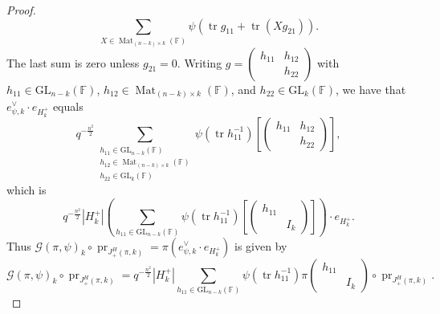 \documentclass[12pt, reqno]{amsart}
\theoremstyle{definition}
\newcommand{\sizeof}[1]{\left|#1\right|}
\newcommand{\fieldCharacter}{\psi}
\newcommand{\IdentityMatrix}[1]{I_{#1}}
\newcommand{\trace}{\operatorname{tr}}
\newcommand{\GL}{\mathrm{GL}}
\newcommand{\Mat}[2]{\operatorname{Mat}_{#1 \times #2}}
\newcommand{\finiteField}{\mathbb{F}}
\newcommand{\GaussSum}[2]{\mathcal{G}\left(#1, #2\right)}
\newcommand{\pHJacquetModule}[2]{J^H_{+}\left(#1, #2\right)}
\newcommand{\ProjectionOperator}{\operatorname{pr}}
\begin{document}
\begin{proof}
		\begin{displaymath}
		\sum_{X \in \Mat{\left(n-k\right)}{k}\left(\finiteField\right)} \fieldCharacter\left(\trace g_{11} + \trace\left(Xg_{21}\right)\right).
		\end{displaymath}
		The last sum is zero unless $g_{21} = 0$. Writing $g = \left(\begin{smallmatrix}
			h_{11} & h_{12}\\
			 & h_{22}
		\end{smallmatrix}\right)$ with $h_{11} \in \GL_{n-k}\left(\finiteField\right)$, $h_{12} \in \Mat{\left(n-k\right)}{k}\left(\finiteField\right)$, and $h_{22} \in \GL_k\left(\finiteField\right)$, we have that $e_{\fieldCharacter, k}^{\vee} \cdot e_{H^+_k}$ equals
		\begin{displaymath}
		q^{-\frac{n^2}{2}} \sum_{\substack{h_{11} \in \GL_{n-k}\left(\finiteField\right)\\
				h_{12} \in \Mat{\left(n-k\right)}{k}\left(\finiteField\right)\\
				h_{22} \in \GL_{k}\left(\finiteField\right) }} \fieldCharacter\left(\trace h_{11}^{-1}\right) \left[\begin{pmatrix}
			h_{11} & h_{12}\\
			& h_{22}
		\end{pmatrix}\right],
		\end{displaymath}
		which is
		\begin{displaymath}
		q^{-\frac{n^2}{2}} \sizeof{H^+_k} \left(\sum_{h_{11} \in \GL_{n-k}\left(\finiteField\right)} \fieldCharacter\left(\trace h_{11}^{-1}\right) \left[\begin{pmatrix}
			h_{11}\\
			& \IdentityMatrix{k}
		\end{pmatrix}\right]\right) \cdot e_{H_k^+}.
		\end{displaymath}
		Thus $\GaussSum{\pi}{\fieldCharacter}_k \circ \ProjectionOperator_{\pHJacquetModule{\pi}{k}} = \pi\left(e_{\fieldCharacter, k}^{\vee} \cdot e_{H^+_k}\right)$ is given by
		\begin{displaymath}
		\GaussSum{\pi}{\fieldCharacter}_k \circ \ProjectionOperator_{\pHJacquetModule{\pi}{k}} = q^{-\frac{n^2}{2}} \sizeof{H^+_k} \sum_{h_{11} \in \GL_{n-k}\left(\finiteField\right)} \fieldCharacter\left(\trace h_{11}^{-1}\right) \pi\begin{pmatrix}
			h_{11}\\
			& \IdentityMatrix{k}
		\end{pmatrix} \circ \ProjectionOperator_{\pHJacquetModule{\pi}{k}}.

\end{displaymath}
\end{proof}
\end{document}
